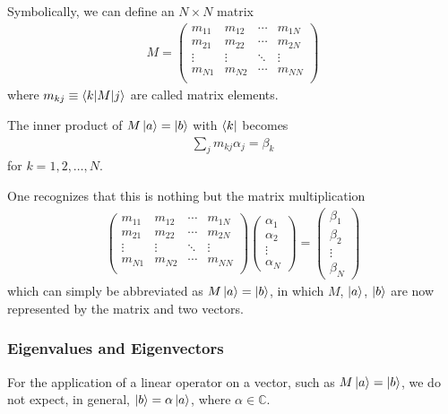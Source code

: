 Symbolically, we can define an $N\times N$ matrix
\begin{align*}
    M=\begin{pmatrix}
        m_{11} & m_{12} & \cdots & m_{1N} \\
        m_{21} & m_{22} & \cdots & m_{2N} \\
        \vdots & \vdots & \ddots & \vdots \\
        m_{N1} & m_{N2} & \cdots & m_{NN} \\
    \end{pmatrix}
\end{align*}
where $m_{kj}\equiv \braket{k|M|j}$ are called matrix elements.

The inner product of $M\ket{a}=\ket{b}$ with $\bra{k}$ becomes
\begin{align*}
    \sum_j m_{kj}\alpha_j=\beta_k
\end{align*}
for $k=1,2,\dots,N$. 

One recognizes that this is nothing but the matrix multiplication
\begin{align*}
    \begin{pmatrix}
        m_{11} & m_{12} & \cdots & m_{1N} \\
        m_{21} & m_{22} & \cdots & m_{2N} \\
        \vdots & \vdots & \ddots & \vdots \\
        m_{N1} & m_{N2} & \cdots & m_{NN} \\
    \end{pmatrix}\begin{pmatrix}
        \alpha_1 \\ \alpha_2 \\ \vdots \\ \alpha_N
    \end{pmatrix}=\begin{pmatrix}
        \beta_1 \\ \beta_2 \\ \vdots \\ \beta_N
    \end{pmatrix}
\end{align*}
which can simply be abbreviated as $M\ket{a}=\ket{b}$, in which $M$, $\ket{a}$, $\ket{b}$ are now represented by the matrix and two vectors.

\subsubsection{Eigenvalues and Eigenvectors}
For the application of a linear operator on a vector, such as
$M\ket{a}=\ket{b}$, we do not expect, in general, $\ket{b}=\alpha\ket{a}$,
where $\alpha\in \mathbb{C}$.


